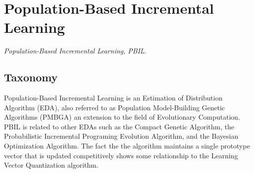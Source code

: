 

\section{Population-Based Incremental Learning} 
\label{sec:pbil}

\emph{Population-Based Incremental Learning, PBIL.}

\subsection{Taxonomy}
Population-Based Incremental Learning is an Estimation of Distribution Algorithm (EDA), also referred to as Population Model-Building Genetic Algorithms (PMBGA) an extension to the field of Evolutionary Computation.
PBIL is related to other EDAs such as the Compact Genetic Algorithm, the Probabilistic Incremental Programing Evolution Algorithm, and the Bayesian Optimization Algorithm. The fact the the algorithm maintains a single prototype vector that is updated competitively shows some relationship to the Learning Vector Quantization algorithm.

